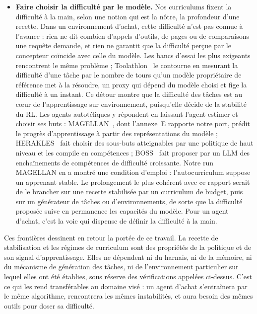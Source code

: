 \documentclass[11pt,a4paper]{article}
\begin{document}
\begin{itemize}
    \item \textbf{Faire choisir la difficulté par le modèle.} Nos curriculums fixent la difficulté à la main, selon une notion qui est la nôtre, la profondeur d'une recette. Dans un environnement d'achat, cette difficulté n'est pas connue à l'avance : rien ne dit combien d'appels d'outils, de pages ou de comparaisons une requête demande, et rien ne garantit que la difficulté perçue par le concepteur coïncide avec celle du modèle. Les bancs d'essai les plus exigeants rencontrent le même problème ; Toolathlon~\cite{toolathlon2025} le contourne en mesurant la difficulté d'une tâche par le nombre de tours qu'un modèle propriétaire de référence met à la résoudre, un proxy qui dépend du modèle choisi et fige la difficulté à un instant. Ce détour montre que la difficulté des tâches est au cœur de l'apprentissage sur environnement, puisqu'elle décide de la stabilité du RL. Les agents autotéliques y répondent en laissant l'agent estimer et choisir ses buts : MAGELLAN~\cite{gaven2025magellan}, dont l'annexe~E rapporte notre port, prédit le progrès d'apprentissage à partir des représentations du modèle ; HERAKLES~\cite{carta2025herakles} fait choisir des sous-buts atteignables par une politique de haut niveau et les compile en compétences ; BOSS~\cite{zhang2023boss} fait proposer par un LLM des enchaînements de compétences de difficulté croissante. Notre run MAGELLAN en a montré une condition d'emploi : l'autocurriculum suppose un apprenant stable. Le prolongement le plus cohérent avec ce rapport serait de le brancher sur une recette stabilisée par un curriculum de budget, puis sur un générateur de tâches ou d'environnements, de sorte que la difficulté proposée suive en permanence les capacités du modèle. Pour un agent d'achat, c'est la voie qui dispense de définir la difficulté à la main.
\end{itemize}

Ces frontières dessinent en retour la portée de ce travail. La recette de stabilisation et les régimes de curriculum sont des propriétés de la politique et de son signal d'apprentissage. Elles ne dépendent ni du harnais, ni de la mémoire, ni du mécanisme de génération des tâches, ni de l'environnement particulier sur lequel elles ont été établies, sous réserve des vérifications appelées ci-dessus. C'est ce qui les rend transférables au domaine visé : un agent d'achat s'entraînera par le même algorithme, rencontrera les mêmes instabilités, et aura besoin des mêmes outils pour doser sa difficulté.
\end{document}
